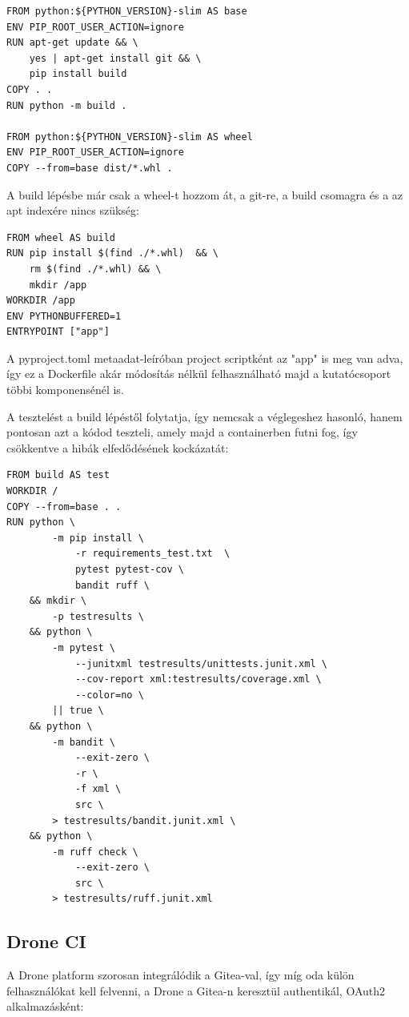 \begin{lstlisting}
FROM python:${PYTHON_VERSION}-slim AS base
ENV PIP_ROOT_USER_ACTION=ignore
RUN apt-get update && \
    yes | apt-get install git && \
    pip install build
COPY . .
RUN python -m build .

FROM python:${PYTHON_VERSION}-slim AS wheel
ENV PIP_ROOT_USER_ACTION=ignore
COPY --from=base dist/*.whl .
\end{lstlisting}

A build lépésbe már csak a wheel-t hozzom át, a git-re, a build csomagra és a az apt indexére nincs szükség:

\begin{lstlisting}
FROM wheel AS build
RUN pip install $(find ./*.whl)  && \
    rm $(find ./*.whl) && \
    mkdir /app
WORKDIR /app
ENV PYTHONBUFFERED=1
ENTRYPOINT ["app"]
\end{lstlisting}

A pyproject.toml metaadat-leíróban project scriptként az "app" is meg van adva, így ez a Dockerfile akár módosítás nélkül felhasználható majd a kutatócsoport többi komponensénél is.

A tesztelést a build lépéstől folytatja, így nemcsak a véglegeshez hasonló, hanem pontosan azt a kódod teszteli, amely majd a containerben futni fog, így csökkentve a hibák elfedődésének kockázatát:

\begin{lstlisting}
FROM build AS test
WORKDIR /
COPY --from=base . .
RUN python \
        -m pip install \
            -r requirements_test.txt  \
            pytest pytest-cov \
            bandit ruff \
    && mkdir \
        -p testresults \
    && python \
        -m pytest \
            --junitxml testresults/unittests.junit.xml \
            --cov-report xml:testresults/coverage.xml \
            --color=no \
        || true \
    && python \
        -m bandit \
            --exit-zero \
            -r \
            -f xml \
            src \
        > testresults/bandit.junit.xml \
    && python \
        -m ruff check \
            --exit-zero \
            src \
        > testresults/ruff.junit.xml
\end{lstlisting}


\subsection{Drone CI}

A Drone platform szorosan integrálódik a Gitea-val, így míg oda külön felhasználókat kell felvenni, a Drone a Gitea-n keresztül authentikál, OAuth2 alkalmazásként:


